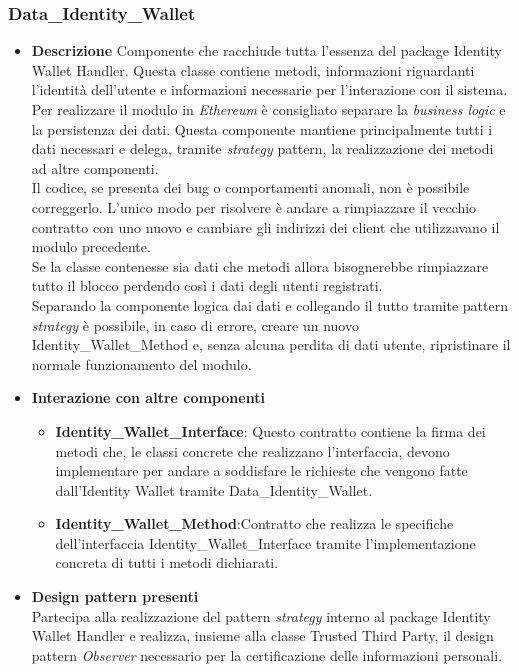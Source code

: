 \subsubsection{Data\_Identity\_Wallet}
\begin{itemize}
	\item \textbf{Descrizione}
	Componente che racchiude tutta l'essenza del package Identity Wallet Handler.
	Questa classe contiene metodi, informazioni riguardanti l'identità dell'utente e informazioni necessarie per l'interazione con il sistema.\\
	Per realizzare il modulo in \textit{Ethereum} è consigliato separare la \textit{business logic} e la persistenza dei dati. Questa componente mantiene principalmente tutti i dati necessari e delega, tramite \textit{strategy} pattern, la realizzazione dei metodi ad altre componenti.\\
	Il codice, se presenta dei bug o comportamenti anomali, non è possibile correggerlo. L'unico modo per risolvere è andare a rimpiazzare il vecchio contratto con uno nuovo e cambiare gli indirizzi dei client che utilizzavano il modulo precedente.\\
	Se la classe contenesse sia dati che metodi allora bisognerebbe rimpiazzare tutto il blocco perdendo così i dati degli utenti registrati.\\
	Separando la componente logica dai dati e collegando il tutto tramite pattern \textit{strategy} è possibile, in caso di errore, creare un nuovo Identity\_Wallet\_Method e, senza alcuna perdita di dati utente, ripristinare il normale funzionamento del modulo.	
	\item \textbf{Interazione con altre componenti}
	\begin{itemize}
		\item\textbf{ Identity\_Wallet\_Interface}: Questo contratto contiene la firma dei metodi che, le classi concrete che realizzano l'interfaccia, devono implementare per andare a soddisfare le richieste che vengono fatte dall'Identity Wallet tramite Data\_Identity\_Wallet.
		\item\textbf{ Identity\_Wallet\_Method}:Contratto che realizza le specifiche dell'interfaccia Identity\_Wallet\_Interface tramite l'implementazione concreta di tutti i metodi dichiarati.
	\end{itemize}
	\item \textbf{Design pattern presenti}\\
	Partecipa alla realizzazione del pattern \textit{strategy} interno al package Identity Wallet Handler e realizza, insieme alla classe Trusted Third Party, il design pattern \textit{Observer} necessario per la certificazione delle informazioni personali.
\end{itemize}
